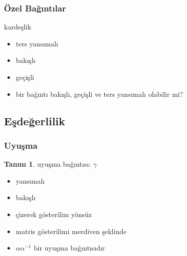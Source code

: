 \documentclass[dvipsnames]{beamer}
\theoremstyle{definition}
\newtheorem{tanim}[theorem]{Tanım}
\theoremstyle{example}
\theoremstyle{plain}
\begin{document}
\begin{frame}
  \frametitle{Özel Bağıntılar}

  \begin{block}{kardeşlik}
    \begin{itemize}
      \item ters yansımalı
      \item bakışlı
      \item geçişli
    \end{itemize}

    \pause
    \medskip
    \begin{itemize}
      \item bir bağıntı bakışlı, geçişli ve ters yansımalı olabilir mi?
    \end{itemize}
  \end{block}
\end{frame}

\subsection{Eşdeğerlilik}

\begin{frame}
  \frametitle{Uyuşma}

  \begin{tanim}
    \alert{uyuşma bağıntısı}: $\gamma$
    \begin{itemize}
      \item yansımalı
      \item bakışlı
    \end{itemize}
  \end{tanim}

  \pause
  \begin{itemize}
    \item çizerek gösterilim yönsüz
    \item matris gösterilimi merdiven şeklinde
  \end{itemize}

  \pause
  \begin{itemize}
    \item $\alpha \alpha^{-1}$ bir uyuşma bağıntısıdır
  \end{itemize}
\end{frame}
\end{document}

